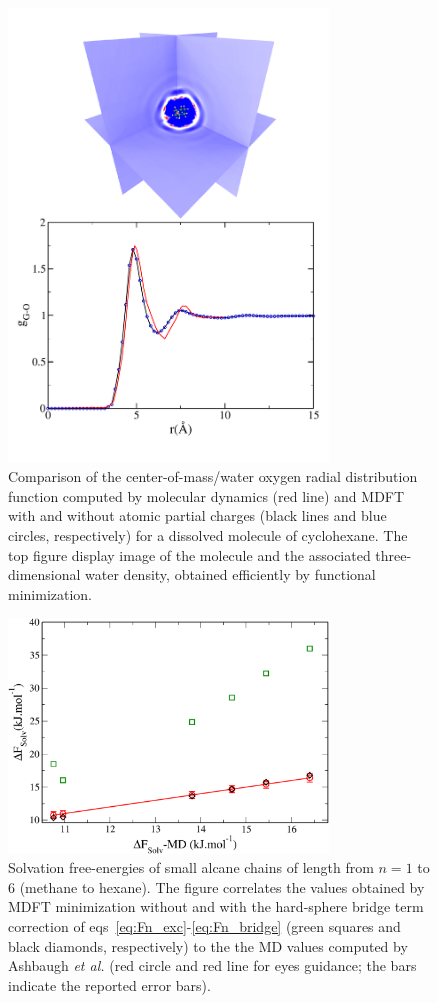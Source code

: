 \documentclass[aip,jcp,preprint]{revtex4-1}
\begin{document}
\begin{figure}
    \includegraphics[width=8.5cm]{cyclohexane_g_and_dens.pdf}
    \caption{
        \label{fig:gr_cyclohexane_neopentane}
        Comparison of the center-of-mass/water oxygen radial distribution function computed by molecular dynamics (red line) and MDFT
        with and without atomic partial charges (black lines and blue circles, respectively) for a dissolved molecule of cyclohexane. The top figure display image of the molecule and the associated three-dimensional water density, obtained efficiently by functional minimization.
        }
\end{figure}

\begin{figure}
    \includegraphics[width=8.5cm]{enercomp_alcanes_MD_MDFT.pdf}
    \caption{
        \label{fig:free_energies_alcanes}
        Solvation free-energies of small alcane chains of length from $n=1$ to 6 (methane to hexane). The figure correlates the values obtained by MDFT minimization without and with the hard-sphere bridge term correction of  eqs~\ref{eq:Fn_exc}-\ref{eq:Fn_bridge} (green squares and black diamonds, respectively) to the the MD values computed by Ashbaugh {\em et al.}\cite{ashbaugh_hydration_1998} (red circle and red line for eyes guidance; the bars indicate the reported error bars).         }
\end{figure}
\end{document}
